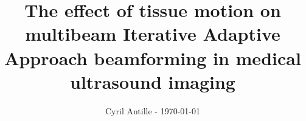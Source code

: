 \documentclass[a4paper,UKenglish]{modules/ifimaster}
\author{Cyril Antille - \today}
\title{The effect of tissue motion on multibeam Iterative Adaptive Approach beamforming in medical ultrasound imaging}
\begin{document}
    \masterfrontpage
    
    
    \frontmatter{}
    
    
    \tableofcontents{}
    \listoffigures{}
    \listoftables{}
    
    \mainmatter{}
    
    
    
    
    
    
    
    
    
    
    \backmatter{}
    
\end{document}

